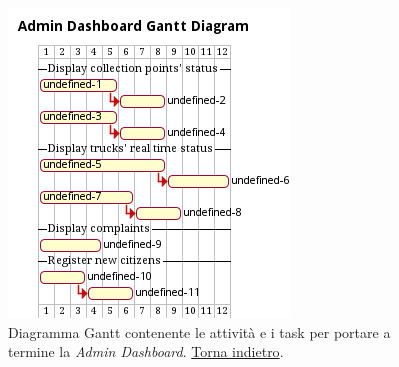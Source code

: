 \begin{figure}[H]
    \centering
    \includegraphics[width=\textwidth]{uml/gantt-admin-dashboard.pm}
    \caption{Diagramma Gantt contenente le attività e i task per portare a termine la \textit{Admin Dashboard}. \hyperlink{back:uml/gantt-admin-dashboard}{Torna indietro}.}
    \label{fig:uml/gantt-admin-dashboard}
\end{figure}

